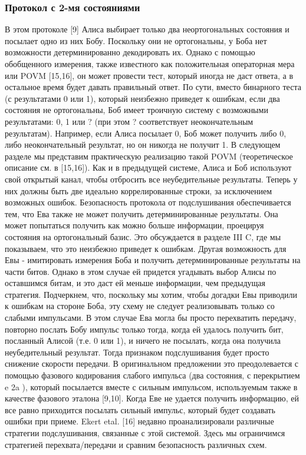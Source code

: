 \subsubsection{Протокол с 2-мя состояниями}
В этом протоколе [9] Алиса выбирает только два неортогональных состояния и посылает одно из них Бобу. Поскольку они не ортогональны, у Боба нет возможности детерминированно декодировать их. Однако с помощью обобщенного измерения, также известного как положительная операторная мера или POVM [15,16], он может провести тест, который иногда не даст ответа, а в остальное время будет давать правильный ответ. По сути, вместо бинарного теста (с результатами 0 или 1), который неизбежно приведет к ошибкам, если два состояния не ортогональны, Боб имеет троичную систему с возможными результатами: 0, 1 или ? (при этом ? соответствует неокончательным результатам). Например, если Алиса посылает 0, Боб может получить либо 0, либо неокончательный результат, но он никогда не получит 1. В следующем разделе мы представим практическую реализацию такой POVM (теоретическое описание см. в [15,16]). Как и в предыдущей системе, Алиса и Боб используют свой открытый канал, чтобы отбросить все неубедительные результаты. Теперь у них должны быть две идеально коррелированные строки, за исключением возможных ошибок. Безопасность протокола от подслушивания обеспечивается тем, что Ева также не может получить детерминированные результаты. Она может попытаться получить как можно больше информации, проецируя состояния на ортогональный базис. Это обсуждается в разделе III C, где мы показываем, что это неизбежно приведет к ошибкам. Другая возможность для Евы - имитировать измерения Боба и получить детерминированные результаты на части битов. Однако в этом случае ей придется угадывать выбор Алисы по оставшимся битам, и это даст ей меньше информации, чем предыдущая стратегия. Подчеркнем, что, поскольку мы хотим, чтобы догадки Евы приводили к ошибкам на стороне Боба, эту схему не следует реализовывать только со слабыми импульсами. В этом случае Ева могла бы просто перехватить передачу, повторно послать Бобу импульс только тогда, когда ей удалось получить бит, посланный Алисой (т.е. 0 или 1), и ничего не посылать, когда она получила неубедительный результат. Тогда признаком подслушивания будет просто снижение скорости передачи. В оригинальном предложении это преодолевается с помощью фазового кодирования слабого импульса (два состояния, с перекрытием e 2a ), который посылается вместе с сильным импульсом, используемым также в качестве фазового эталона [9,10]. Когда Еве не удается получить информацию, ей все равно приходится посылать сильный импульс, который будет создавать ошибки при приеме. Ekert etal. [16] недавно проанализировали различные стратегии подслушивания, связанные с этой системой. Здесь мы ограничимся стратегией перехвата/передачи и сравним безопасность различных схем.

